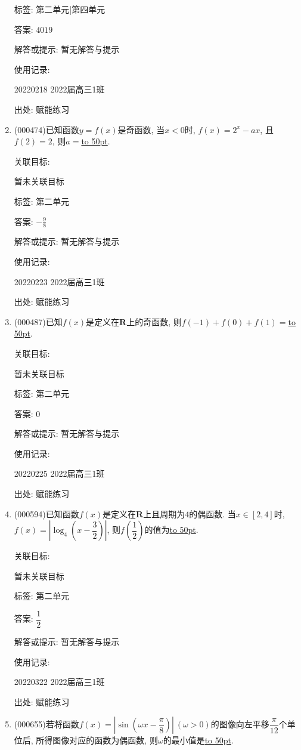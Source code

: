 \documentclass[10pt,a4paper]{article}
\newcommand{\blank}[1]{\underline{\hbox to #1pt{}}}
\begin{document}
\begin{enumerate}[1.]
标签: 第二单元|第四单元

答案: $4019$

解答或提示: 暂无解答与提示

使用记录:

20220218	2022届高三1班	


出处: 赋能练习
\item { (000474)}已知函数$y=f(x)$是奇函数, 当$x<0$时, $f(x)=2^x-ax$, 且$f(2)=2$, 则$a=$\blank{50}.


关联目标:

暂未关联目标



标签: 第二单元

答案: $-\frac 98$

解答或提示: 暂无解答与提示

使用记录:

20220223	2022届高三1班	


出处: 赋能练习
\item { (000487)}已知$f(x)$是定义在$\mathbf{R}$上的奇函数, 则$f(-1)+f(0)+f(1)=$\blank{50}.


关联目标:

暂未关联目标



标签: 第二单元

答案: $0$

解答或提示: 暂无解答与提示

使用记录:

20220225	2022届高三1班	


出处: 赋能练习
\item { (000594)}已知函数$f(x)$是定义在$\mathbf{R}$上且周期为$4$的偶函数. 当$x\in [2,4]$时, $f(x)=\left|\log_4(x-\dfrac32)\right|$, 则$f(\dfrac12)$的值为\blank{50}.


关联目标:

暂未关联目标



标签: 第二单元

答案: $\dfrac 12$

解答或提示: 暂无解答与提示

使用记录:

20220322	2022届高三1班	


出处: 赋能练习
\item { (000655)}若将函数$f(x)=|\sin(\omega x-\dfrac{\pi}8)| \ (\omega >0)$的图像向左平移$\dfrac{\pi}{12}$个单位后, 所得图像对应的函数为偶函数, 则$\omega$的最小值是\blank{50}.



\end{enumerate}
\end{document}

